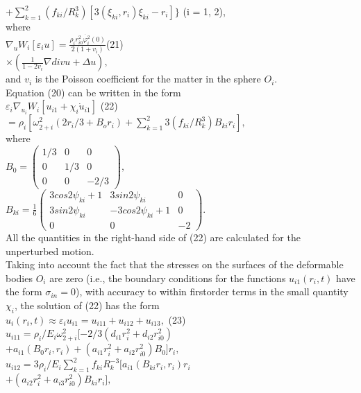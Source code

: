 \documentclass[fontsize = 11pt,a4paper]{article}
\begin{document}
\begin{multicols}{2}
$+  \sum\limits_{k=1}^{2} (f_{ki} / R^3_k)[3(\xi_{ki},r_i) \xi_{ki} - r_i] \}$ (i = 1, 2),\\
where\\
$\nabla_{u}W_i[\varepsilon_i u] = \frac{\rho_ir^2_{i0}\dot{\varphi^2_i}(0)}{2(1 + v_i)}$\hfill (21)\\
$ \times (\frac{1}{1 - 2v_i}\nabla div u + \Delta u),$ \\
and $v_i$ is the Poisson coefficient for the matter in the
sphere $O_i$.\\
Equation (20) can be written in the form\\
${\varepsilon_i} \nabla_{u_i} W_i [u_{i1} + \chi_i \dot u_{i1}]$ \hfill (22) \\
$=\rho_i [\omega^2_{2+i}(2r_i/3 + B_o r_i) +  \sum\limits_{k=1}^{2} 3 (f_{ki}/R^3_k)B_{ki} r_{i}],$\\
where\\
$B_0 = 
\begin{pmatrix} 
1/3 & 0 &  0 \\
0 & 1/3 & 0 \\
0 & 0 & -2/3
\end{pmatrix}, $
\\
$B_{ki} = \frac{1}{6}
\begin{pmatrix} 
3cos 2 \psi_{ki} + 1  & 3 sin 2 \psi_{ki} &  0 \\
3 sin 2 \psi_{ki} & -3cos 2 \psi_{ki} + 1 & 0 \\
0 & 0 & -2
\end{pmatrix}.$\\
All the quantities in the right-hand side of (22) are
calculated for the unperturbed motion.\\
Taking into account the fact that the stresses on
the surfaces of the deformable bodies $O_i$ are zero (i.e.,
the boundary conditions for the functions $u_{i1}(r_i, t)$
have the form $\sigma_{in} = 0$), with accuracy to within firstorder
terms in the small quantity $\chi_i$, the solution of
(22) has the form\\
$u_i(r_i,t) \approx \varepsilon_i u_{i1} = u_{i11} + u_{i12} + u_{i13},$ \hfill (23) \\
$u_{i11} = \rho_i / E_i \omega^2_{2 + i} [-2/3(d_{i1} r^2_i + d_{i2} r^2_{i0})$\\
$+ a_{i1}(B_0 r_i, r_i) + (a_{i1} r^2_i + a_{i2} r^2_{i0})B_0]r_i,$\\
$u_{i12} = 3 \rho_i / E_i \sum\limits_{k=1}^{2} f_{ki} R^{-3}_k [a_{i1}(B_{ki}r_i,r_i)r_i$\\
$ + (a_{i2}r^2_i + a_{i3} r^2_{i0}) B_{ki}r_i],$\\

\end{multicols}
\end{document}
